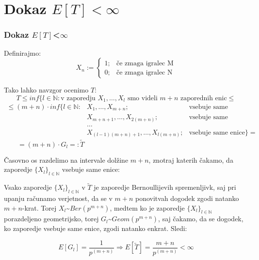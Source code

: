 \documentclass[10pt]{beamer}
\begin{document}
\section{Dokaz $E[T]<\infty$}
\begin{frame}
\frametitle{Dokaz $E[T]$<$\infty$}
Definirajmo:
\[
X_n := \left\{
\begin{array}{rl}
1; & \textrm{če zmaga igralec M}\\
0; & \textrm{če zmaga igralec N}
\end{array}
\right.
\]

Tako lahko navzgor ocenimo $T$:
$$T \leq inf\{ l \in \mathbb{N}: \textrm{v zaporedju } X_1, \dots, X_l \textrm{ smo videli } m+n \textrm{ zaporednih enic} \leq$$ 
$$
\begin{array} {lll} 
\leq (m+n)\cdot inf\{ l \in \mathbb{N}:& X_1, \dots, X_{m+n}; & \textrm{vsebuje same enice, ali} \\ 
&X_{m+n+1}, \dots, X_{2(m+n)};& \textrm{vsebuje same enice, ali}\\
&\dots \\
&X_{(l-1)(m+n)+1}, \dots, X_{l(m+n)}; & \textrm{vsebuje same enice}\}=
\end{array}$$
$\quad \quad= (m+n)\cdot G_l =: \widetilde{T}$\\

\end{frame}

\begin{frame}
Časovno os razdelimo na intervale dolžine $m+n$, znotraj katerih čakamo, da zaporedje $\{X_l\}_{l \in \mathbb{N}}$ vsebuje same enice:
\begin{center}
\end{center}
Vsako zaporedje $\{X_l\}_{l \in \mathbb{N}}$ v $\widetilde{T}$ je zaporedje Bernoullijevih spremenljivk, saj pri upanju računamo verjetnost, da se v $m+n$ ponovitvah dogodek zgodi natanko $m+n$-krat. Torej $X_l$\textasciitilde $Ber(p^{m+n})$, medtem ko je zaporedje 
$\{X_l\}_{l \in \mathbb{N}}$ porazdeljeno geometrijsko, torej $G_l$\textasciitilde $Geom(p^{m+n})$, saj čakamo, da se dogodek, ko zaporedje vsebuje same enice, zgodi natanko enkrat. Sledi:

$$E[G_l]=\frac{1}{p^{(m+n)}} \Longrightarrow E[\widetilde{T}] = \frac{m+n}{p^{(m+n)}} < \infty$$
\end{frame}
\end{document}
